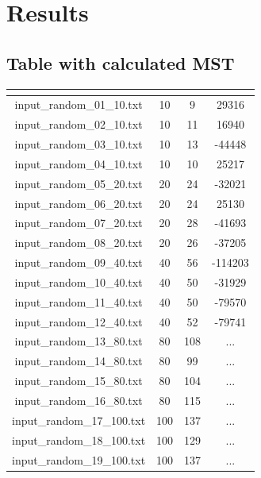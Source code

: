 \section{Results}\label{results}

\subsection{Table with calculated MST}
	
	\renewcommand{\arraystretch}{1.5}
	\begin{longtable}{|c|c|c|c|}
		\hline
		\rowcolor{title_row}
		\textbf{\color{title_text}{Input file}} &
		\textbf{\color{title_text}{num\_nodes}} & \textbf{\color{title_text}{num\_Edges}} & \textbf{\color{title_text}{MST}}\\
		\hline
		\endhead
		input\_random\_01\_10.txt & 10 & 9 & 29316 \\ \hline 
		input\_random\_02\_10.txt & 10 & 11 & 16940 \\ \hline 
		input\_random\_03\_10.txt & 10 & 13 & -44448 \\ \hline
		input\_random\_04\_10.txt & 10 & 10 & 25217 \\ \hline
		input\_random\_05\_20.txt & 20 & 24 & -32021 \\ \hline
		input\_random\_06\_20.txt & 20 & 24 & 25130 \\ \hline
		input\_random\_07\_20.txt & 20 & 28 & -41693 \\ \hline
		input\_random\_08\_20.txt & 20 & 26 & -37205 \\ \hline
		input\_random\_09\_40.txt & 40 & 56 & -114203 \\ \hline
		input\_random\_10\_40.txt & 40 & 50 & -31929 \\ \hline
		input\_random\_11\_40.txt & 40 & 50 & -79570
		 \\ \hline
		input\_random\_12\_40.txt & 40 & 52 & -79741
		 \\ \hline
		input\_random\_13\_80.txt & 80 & 108 & ... \\ \hline
		input\_random\_14\_80.txt & 80 & 99 & ... \\ \hline
		input\_random\_15\_80.txt & 80 & 104 & ... \\ \hline
		input\_random\_16\_80.txt & 80 & 115 & ... \\ \hline
		input\_random\_17\_100.txt & 100 & 137 & ... \\ \hline
		input\_random\_18\_100.txt & 100 & 129 & ... \\ \hline
		input\_random\_19\_100.txt & 100 & 137 & ... \\ \hline

\end{longtable}
